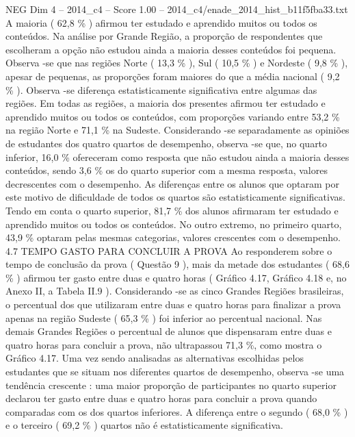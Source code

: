 \begin{textsample}{NEG Dim 4 – 2014\_c4 – Score 1.00 – 2014\_c4/enade\_2014\_hist\_b11f5fba33.txt}
A maioria ( 62,8 \% ) afirmou ter estudado e aprendido muitos ou todos os conteúdos.
Na análise por Grande Região, a proporção de respondentes que escolheram a opção não estudou ainda a maioria desses conteúdos foi pequena.
Observa -se que nas regiões Norte ( 13,3 \% ), Sul ( 10,5 \% ) e Nordeste ( 9,8 \% ), apesar de pequenas, as proporções foram maiores do que a média nacional ( 9,2 \% ).
Observa -se diferença estatisticamente significativa entre algumas das regiões.
Em todas as regiões, a maioria dos presentes afirmou ter estudado e aprendido muitos ou todos os conteúdos, com proporções variando entre 53,2 \% na região Norte e 71,1 \% na Sudeste.
Considerando -se separadamente as opiniões de estudantes dos quatro quartos de desempenho, observa -se que, no quarto inferior, 16,0 \% ofereceram como resposta que não estudou ainda a maioria desses conteúdos, sendo 3,6 \% os do quarto superior com a mesma resposta, valores decrescentes com o desempenho.
As diferenças entre os alunos que optaram por este motivo de dificuldade de todos os quartos são estatisticamente significativas.
Tendo em conta o quarto superior, 81,7 \% dos alunos afirmaram ter estudado e aprendido muitos ou todos os conteúdos.
No outro extremo, no primeiro quarto, 43,9 \% optaram pelas mesmas categorias, valores crescentes com o desempenho. 4.7 TEMPO GASTO PARA CONCLUIR A PROVA Ao responderem sobre o tempo de conclusão da prova ( Questão 9 ), mais da metade dos estudantes ( 68,6 \% ) afirmou ter gasto entre duas e quatro horas ( Gráfico 4.17, Gráfico 4.18 e, no Anexo II, a Tabela II.9 ).
Considerando -se as cinco Grandes Regiões brasileiras, o percentual dos que utilizaram entre duas e quatro horas para finalizar a prova apenas na região Sudeste ( 65,3 \% ) foi inferior ao percentual nacional.
Nas demais Grandes Regiões o percentual de alunos que dispensaram entre duas e quatro horas para concluir a prova, não ultrapassou 71,3 \%, como mostra o Gráfico 4.17.
Uma vez sendo analisadas as alternativas escolhidas pelos estudantes que se situam nos diferentes quartos de desempenho, observa -se uma tendência crescente : uma maior proporção de participantes no quarto superior declarou ter gasto entre duas e quatro horas para concluir a prova quando comparadas com os dos quartos inferiores.
A diferença entre o segundo ( 68,0 \% ) e o terceiro ( 69,2 \% ) quartos não é estatisticamente significativa.

\end{textsample}
